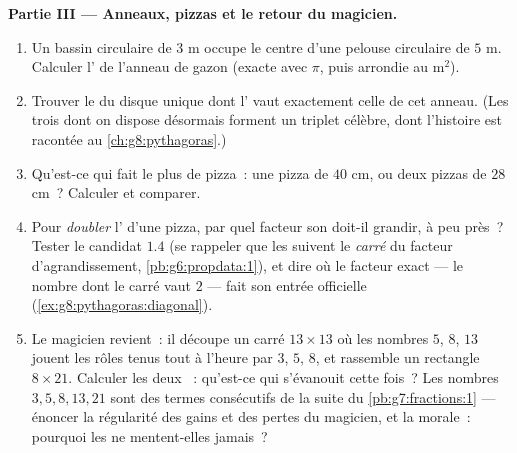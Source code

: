 \begin{problem}[{Devoir maison --- une célèbre «~preuve~» que
$64 = 65$, démasquée par les aires et les pentes, avec pizzas et
anneaux pour le dessert}]
\medskip
\noindent\textbf{Partie III --- Anneaux, pizzas et le retour du
magicien.}
\begin{enumerate}[resume]
  \item Un bassin circulaire de  $3$ m occupe le centre d'une
        pelouse circulaire de  $5$ m. Calculer l' de
        l'anneau de gazon (exacte avec $\pi$, puis arrondie au
        m$^2$).
  \item Trouver le  du disque unique dont l' vaut
        exactement celle de cet anneau. (Les trois  dont on
        dispose désormais forment un triplet célèbre, dont
        l'histoire est racontée au \cref{ch:g8:pythagoras}.)
  \item Qu'est-ce qui fait le plus de pizza~: une pizza de 
        $40$ cm, ou deux pizzas de  $28$ cm~? Calculer et
        comparer.
  \item Pour \emph{doubler} l' d'une pizza, par quel facteur son
         doit-il grandir, à peu près~? Tester le candidat $1.4$
        (se rappeler que les  suivent le \emph{carré} du
        facteur d'agrandissement, \cref{pb:g6:propdata:1}), et dire
        où le facteur exact --- le nombre dont le carré vaut $2$ ---
        fait son entrée officielle
        (\cref{ex:g8:pythagoras:diagonal}).
  \item Le magicien revient~: il découpe un carré $13 \times 13$ où
        les nombres $5$, $8$, $13$ jouent les rôles tenus tout à
        l'heure par $3$, $5$, $8$, et rassemble un rectangle
        $8 \times 21$. Calculer les deux ~: qu'est-ce qui
        s'évanouit cette fois~? Les nombres $3, 5, 8, 13, 21$ sont
        des termes consécutifs de la suite du
        \cref{pb:g7:fractions:1} --- énoncer la régularité des gains
        et des pertes du magicien, et la morale~: pourquoi les 
        ne mentent-elles jamais~?
\end{enumerate}
\end{problem}
